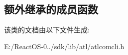 \subsection*{额外继承的成员函数}


该类的文档由以下文件生成\+:\begin{DoxyCompactItemize}
\item 
E\+:/\+React\+O\+S-\/0../sdk/lib/atl/atlcomcli.\+h\end{DoxyCompactItemize}

